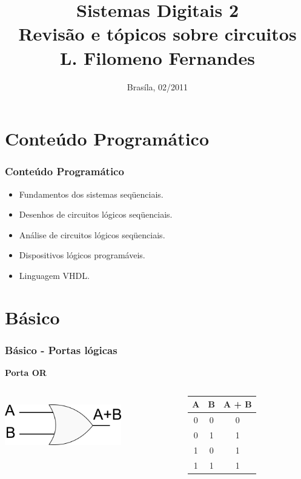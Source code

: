 \documentclass{beamer}
\title{Sistemas Digitais 2\\ \textbf{Revisão e tópicos sobre circuitos}\\ \textbf{L. Filomeno  Fernandes}}
\date{Brasíla, 02/2011}
\institute{\textbf{Universidade de Brasília - Faculdade do Gama}}
\begin{document}
\begin{frame}
  \titlepage
\end{frame}

\section{Conteúdo Programático}
\begin{frame}
  \frametitle{Conteúdo Programático}
  \begin{itemize}
   \item Fundamentos dos sistemas seqüenciais.\pause
   \item Desenhos de circuitos lógicos seqüenciais. \pause
   \item Análise de circuitos lógicos seqüenciais. \pause
   \item Dispositivos lógicos programáveis.\pause
   \item Linguagem VHDL.
  \end{itemize}

\end{frame}

\section{Básico}
\begin{frame}
  \frametitle{Básico - Portas lógicas}
\begin{center}
  \textbf{\huge{Porta OR}}
  \begin{columns}[c]
   \begin{column}{5cm}
    \includegraphics[height = 1in, width = 2in]{or.png}
   \end{column}\pause
   \begin{column}{5cm}
    \begin{tabular}{|c|c|c|}
     \hline
     A & B & A + B \\
     \hline	
     0 & 0 & 0 \\
     0 & 1 & 1 \\
     1 & 0 & 1 \\
     1 & 1 & 1 \\ 
     \hline
    \end{tabular}
   \end{column}

  \end{columns}
\end{center}
\end{frame}
\end{document}
